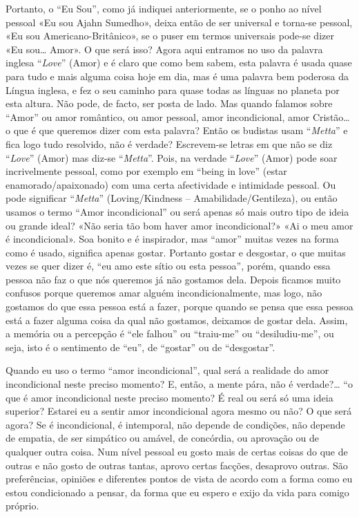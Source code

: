Portanto, o ``Eu Sou'', como já indiquei anteriormente, se o ponho ao
nível pessoal «Eu sou Ajahn Sumedho», deixa então de ser universal e
torna-se pessoal, «Eu sou Americano-Britânico», se o puser em termos
universais pode-se dizer «Eu sou\ldots{} Amor». O que será isso? Agora aqui
entramos no uso da palavra inglesa ``\emph{Love}'' (Amor) e é claro que
como bem sabem, esta palavra é usada quase para tudo e mais alguma coisa
hoje em dia, mas é uma palavra bem poderosa da Língua inglesa, e fez o
seu caminho para quase todas as línguas no planeta por esta altura. Não
pode, de facto, ser posta de lado. Mas quando falamos sobre ``Amor'' ou
amor romântico, ou amor pessoal, amor incondicional, amor Cristão\ldots{} o
que é que queremos dizer com esta palavra? Então os budistas usam
``\emph{Metta}'' e fica logo tudo resolvido, não é verdade? Escrevem-se
letras em que não se diz ``\emph{Love}'' (Amor) mas diz-se
``\emph{Metta}''. Pois, na verdade ``\emph{Love}'' (Amor) pode soar
incrivelmente pessoal, como por exemplo em ``being in love'' (estar
enamorado/apaixonado) com uma certa afectividade e intimidade pessoal.
Ou pode significar ``\emph{Metta}'' (Loving/Kindness --
Amabilidade/Gentileza), ou então usamos o termo ``Amor incondicional''
ou será apenas só mais outro tipo de ideia ou grande ideal? «Não seria
tão bom haver amor incondicional?» «Ai o meu amor é incondicional». Soa
bonito e é inspirador, mas ``amor'' muitas vezes na forma como é usado,
significa apenas gostar. Portanto gostar e desgostar, o que muitas vezes
se quer dizer é, ``eu amo este sítio ou esta pessoa'', porém, quando
essa pessoa não faz o que nós queremos já não gostamos dela. Depois
ficamos muito confusos porque queremos amar alguém incondicionalmente,
mas logo, não gostamos do que essa pessoa está a fazer, porque quando se
pensa que essa pessoa está a fazer alguma coisa da qual não gostamos,
deixamos de gostar dela. Assim, a memória ou a percepção é ``ele
falhou'' ou ``traiu-me'' ou ``desiludiu-me'', ou seja, isto é o
sentimento de ``eu'', de ``gostar'' ou de ``desgostar''.

Quando eu uso o termo ``amor incondicional'', qual será a realidade do
amor incondicional neste preciso momento? E, então, a mente pára, não é
verdade?\ldots{} ``o que é amor incondicional neste preciso momento? É real ou
será só uma ideia superior? Estarei eu a sentir amor incondicional agora
mesmo ou não? O que será agora? Se é incondicional, é intemporal, não
depende de condições, não depende de empatia, de ser simpático ou
amável, de concórdia, ou aprovação ou de qualquer outra coisa. Num nível
pessoal eu gosto mais de certas coisas do que de outras e não gosto de
outras tantas, aprovo certas facções, desaprovo outras. São
preferências, opiniões e diferentes pontos de vista de acordo com a
forma como eu estou condicionado a pensar, da forma que eu espero e
exijo da vida para comigo próprio.


